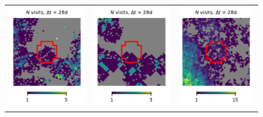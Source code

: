 \documentclass[preprintm,linenumbers]{aastex631}
\begin{document}
\begin{figure}
\begin{tabular}{  c c c}
				\includegraphics{results/skymaps_cutout/skymaps_cutout_first_year_one_snap_v4_0_10yrs_db_noDD_noTwi_tscale-28_nside-256_doAllTemplateMetrics_reduceCount_g_NES_noDD_noTwi.pdf} &
				\includegraphics{results/skymaps_cutout/skymaps_cutout_first_year_one_snap_v4_0_10yrs_db_noDD_noTwi_tscale-28_nside-256_doAllTemplateMetrics_reduceCount_g_WFD_noDD_noTwi.pdf} &
				\includegraphics{results/skymaps_cutout/skymaps_cutout_first_year_one_snap_v4_0_10yrs_db_noDD_noTwi_tscale-28_nside-256_doAllTemplateMetrics_reduceCount_g_GP_noDD_noTwi.pdf} \\

\end{tabular}
\end{figure}
\end{document}
